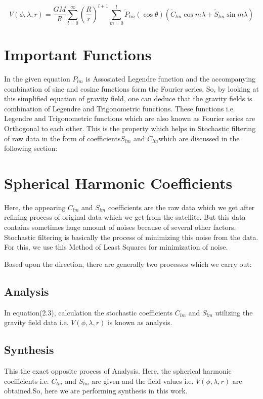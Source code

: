 \documentclass[a4paper,12pt]{report}
\begin{document}
\begin{equation}
V(\phi,\lambda,r)=\frac{GM}{R}\sum_{l=0}^{\infty} \left(\frac{R}{r}\right)^{l+1}\sum_{m=0}^{l} \widetilde{P}_{lm}(\cos\theta)(\widetilde{C}_{lm}\cos m\lambda + \widetilde{S}_{lm}\sin m\lambda)
\end{equation}

\section{Important Functions} 
In the given equation $P_{lm}$ is Assosiated Legendre function and the accompanying combination of sine and cosine functions form the Fourier series. So, by looking at this simplified equation of gravity field, one can deduce that the gravity fields is combination of Legendre and Trigonometric functions.
These functions i.e. Legendre and Trigonometric functions which are also known as Fourier series are Orthogonal to each other. This is the property which helps in Stochastic filtering of raw data in the form of coefficients$ S_{lm}$ and $C_{lm} $which are discussed in the following section:  

\section{Spherical Harmonic Coefficients} 
Here, the appearing $C_{lm}$ and $S_{lm}$ coefficients are the raw data which we get after refining process of original data which we get from the satellite. But this data contains sometimes huge amount of noises because of several other factors. Stochastic filtering is basically the process of minimizing this noise from the data. For this, we use this Method of Least Squares for minimization of noise.

Based upon the direction, there are generally two processes which we carry out:

\newpage

\subsection{Analysis}  In equation(2.3), calculation the stochastic coefficients $C_{lm} $ and $S_{lm}$ utilizing the gravity field data i.e. $V(\phi,\lambda,r)$ is known as analysis.
 \subsection{Synthesis} This the exact opposite process of Analysis. Here, the spherical harmonic coefficients i.e.  $C_{lm} $ and $S_{lm}$ are given and the field values i.e. $V(\phi,\lambda,r)$ are obtained.So, here we are performing synthesis in this work. \\
\end{document}
